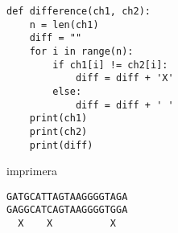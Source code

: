 \begin{Answer}
\begin{lstlisting}
def difference(ch1, ch2):
    n = len(ch1)
    diff = ""
    for i in range(n):
        if ch1[i] != ch2[i]:
            diff = diff + 'X'
        else:
            diff = diff + ' '
    print(ch1)
    print(ch2)
    print(diff)
\end{lstlisting}
\end{Answer}
 imprimera
\begin{lstlisting}
GATGCATTAGTAAGGGGTAGA
GAGGCATCAGTAAGGGGTGGA
  X    X          X  
  \end{lstlisting}
